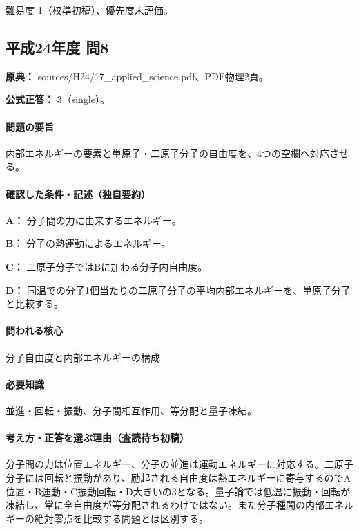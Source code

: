 \par 難易度 1（校準初稿）、優先度未評価。

\subsection{平成24年度 問8}
\label{q:h24-reg-applied-08}

\noindent\textbf{原典：} sources/H24/17\_applied\_science.pdf、PDF物理2頁。

\textbf{公式正答：} 3（single）。

\paragraph{問題の要旨} 内部エネルギーの要素と単原子・二原子分子の自由度を、4つの空欄へ対応させる。

\paragraph{確認した条件・記述（独自要約）}\mbox{}\par

\noindent\textbf{A：} 分子間の力に由来するエネルギー。\par

\noindent\textbf{B：} 分子の熱運動によるエネルギー。\par

\noindent\textbf{C：} 二原子分子ではBに加わる分子内自由度。\par

\noindent\textbf{D：} 同温での分子1個当たりの二原子分子の平均内部エネルギーを、単原子分子と比較する。\par

\paragraph{問われる核心} 分子自由度と内部エネルギーの構成

\paragraph{必要知識} 並進・回転・振動、分子間相互作用、等分配と量子凍結。

\paragraph{考え方・正答を選ぶ理由（査読待ち初稿）} 分子間の力は位置エネルギー、分子の並進は運動エネルギーに対応する。二原子分子には回転と振動があり、励起される自由度は熱エネルギーに寄与するのでA位置・B運動・C振動回転・D大きいの3となる。量子論では低温に振動・回転が凍結し、常に全自由度が等分配されるわけではない。また分子種間の内部エネルギーの絶対零点を比較する問題とは区別する。

